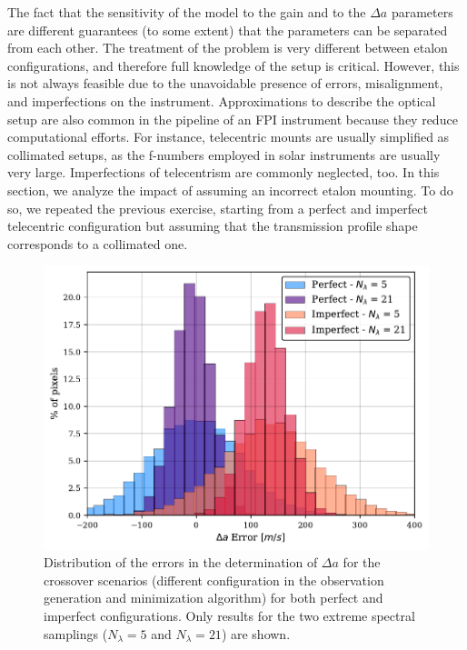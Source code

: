 The fact that the sensitivity of the model to the gain and to the $\Delta a$ parameters are different guarantees (to some extent) that the parameters can be separated from each other. The treatment of the problem is very different between etalon configurations, and therefore full knowledge of the setup is critical. However, this is not always feasible due to the unavoidable presence of errors, misalignment, and imperfections on the instrument. Approximations to describe the optical setup are also common in the pipeline of an FPI instrument because they reduce computational efforts. For instance, telecentric mounts are usually simplified as collimated setups, as the f-numbers employed in solar instruments are usually very large. Imperfections of telecentrism are commonly neglected, too. In this section, we analyze the impact of assuming an incorrect etalon mounting. To do so, we repeated the previous exercise, starting from a perfect and imperfect telecentric configuration but assuming that the transmission profile shape corresponds to a collimated one.    

\begin{figure}
    \begin{minipage}[c]{0.6\textwidth}
      \includegraphics[width=\textwidth]{figures/EtalonPaper/histograms.pdf}
    \end{minipage}\hfill
    \begin{minipage}[c]{0.37\textwidth}
      \caption{
        Distribution of the errors in the determination of $\Delta a$ for the crossover scenarios (different configuration in the observation generation and minimization algorithm) for both perfect and imperfect configurations. Only results for the two extreme spectral samplings ($N_ \lambda = 5$ and $N_\lambda = 21$) are shown.
      } \label{fig_etalon_corr:Crossover_histograms}
    \end{minipage}
  \end{figure}

